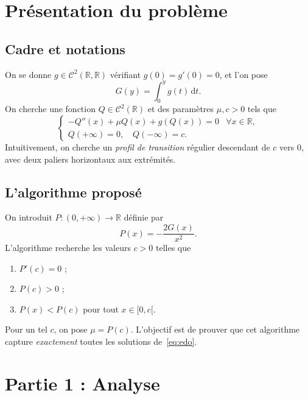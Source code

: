\documentclass[11pt,a4paper]{article}
\theoremstyle{plain}
\theoremstyle{remark}
\newcommand{\R}{\mathbb{R}}
\newcommand{\dd}{\,\mathrm{d}}
\begin{document}
\section{Présentation du problème}

\subsection{Cadre et notations}
On se donne $g\in\mathcal{C}^2(\R,\R)$ vérifiant $g(0)=g'(0)=0$, et l'on pose
\[
  G(y)=\int_0^y g(t)\dd t.
\]
On cherche une fonction $Q\in\mathcal{C}^2(\R)$ et des paramètres $\mu,c>0$ tels
que
\begin{equation}\label{eq:edo}
  \begin{cases}
    -Q''(x)+\mu Q(x)+g(Q(x))=0 & \forall x\in\R,\\[2pt]
    Q(+\infty)=0,\quad Q(-\infty)=c.
  \end{cases}
\end{equation}
Intuitivement, on cherche un \emph{profil de transition} régulier descendant de
$c$ vers $0$, avec deux paliers horizontaux aux extrémités.

\subsection{L'algorithme proposé}
On introduit $P:(0,+\infty)\to\R$ définie par
\[
  P(x)=-\frac{2G(x)}{x^2}.
\]
L'algorithme recherche les valeurs $c>0$ telles que
\begin{enumerate}[label=(\roman*),leftmargin=2.2em]
  \item $P'(c)=0$ ;
  \item $P(c)>0$ ;
  \item $P(x)<P(c)$ pour tout $x\in[0,c[$.
\end{enumerate}
Pour un tel $c$, on pose $\mu=P(c)$. L'objectif est de prouver que cet algorithme
capture \emph{exactement} toutes les solutions de~\eqref{eq:edo}.

\section{Partie 1 : Analyse}
\label{sec:analyse}
\end{document}
